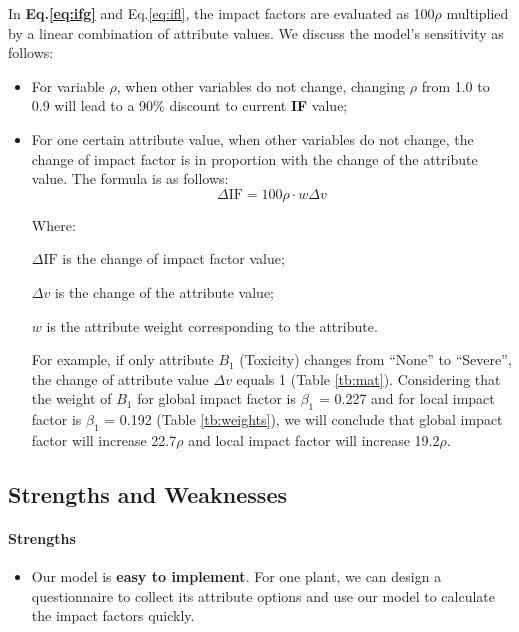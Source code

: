\documentclass[12pt]{article}
\begin{document}
		In \textbf{Eq.\ref{eq:ifg}} and Eq.\ref{eq:ifl}, the impact factors are evaluated as 100$\rho$ multiplied by a linear combination of attribute values.  We discuss the model's sensitivity as follows:
		\vspace{-0.2cm}
		\begin{itemize}
			\item For variable $\rho$, when other variables do not change, changing $\rho$ from 1.0 to 0.9 will lead to a 90\% discount to current \textbf{IF} value;
			\vspace{-0.2cm}
			\item For one certain attribute value, when other variables do not change, the change of impact factor is in proportion with the change of the attribute value.  The formula is as follows:
			\[
				\Delta\mathrm{IF} = 100\rho\cdot w\Delta v
			\]
			
			Where:
			
			{
			\setlength{\parindent}{2em}
			$\Delta\mathrm{IF}$ is the change of impact factor value;
			
			\vspace{-0.15cm}
			$\Delta v$ is the change of the attribute value;
			
			\vspace{-0.15cm}
			$w$ is the attribute weight corresponding to the attribute.
			}
			
			\vspace{0.15cm}
			
			For example, if only attribute $B_1$ (Toxicity) changes from ``None'' to ``Severe'', the change of attribute value $\Delta v$ equals 1 (Table \ref{tb:mat}).  Considering that the weight of $B_1$ for global impact factor is $\beta_1$ = 0.227 and for local impact factor is $\beta_1$ = 0.192 (Table \ref{tb:weights}), we will conclude that global impact factor will increase 22.7$\rho$ and local impact factor will increase 19.2$\rho$.
			
		\end{itemize} 
		
		
	\subsection{Strengths and Weaknesses}

		\paragraph{Strengths}
		\vspace{-0.1cm}
		\begin{itemize}
			\vspace{-0.3cm}
			\item Our model is \textbf{easy to implement}.  For one plant, we can design a questionnaire to collect its attribute options and use our model to calculate the impact factors quickly.
		\end{itemize}
		
\end{document}
